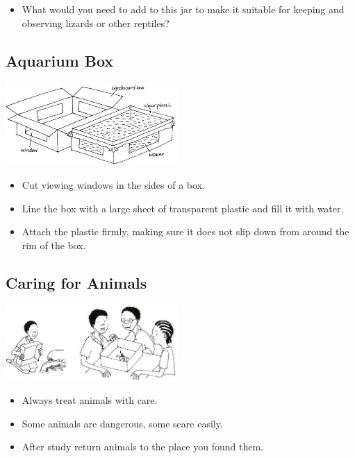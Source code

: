 \begin{multicols}{2}
\begin{itemize}
\item What would you need to add to
this jar to make it suitable for
keeping and observing lizards
or other reptiles?
\end{itemize}

\columnbreak

\subsection{Aquarium Box} 

\begin{center}
\includegraphics[width=0.49\textwidth]{./img/vso/aquarium.jpg}
\end{center}

\begin{itemize}
\item Cut viewing windows in the
sides of a box.
\item Line the box with a large sheet
of transparent plastic and fill it
with water.
\item Attach the plastic firmly,
making sure it does not slip
down from around the rim of
the box.
\end{itemize}


\subsection{Caring for Animals}

\begin{center}
\includegraphics[width=0.49\textwidth]{./img/vso/caring-animals.jpg}
\end{center}

\begin{itemize}
\item Always treat animals with care.
\item Some animals are dangerous,
some scare easily.
\item After study return animals to
the place you found them.
\end{itemize}

\end{multicols}







